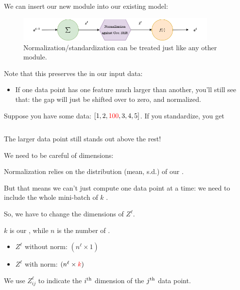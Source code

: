             We can insert our new module into our existing model:


            \begin{figure}[H]
                \centering
                    \includegraphics[width=100mm,scale=0.5]{images/nn_2_images/cov_shift_neuron.png}
                
                \caption*{Normalization/standardization can be treated just like any other module.}
            \end{figure}

            \subsecdiv

            Note that this preserves the  in our input data:
            
            \begin{itemize}
                \item If one data point has one feature much larger than another, you'll still see that: the gap will just be shifted over to zero, and normalized.
                
            \end{itemize}

            \miniex Suppose you have some data: $[1,2,\textcolor{red}{100},3,4,5]$. If you standardize, you get

            \begin{equation}
                [-0.458, -0.433, \red{2.04}, -0.408, -0.383, -0.358, ]
            \end{equation}

            The larger data point still stands out above the rest!
            
            We need to be careful of dimensions:\\

            \begin{clarification}
                Normalization relies on the distribution (mean, s.d.) of our .

                But that means we can't just compute one data point at a time: we need to include the whole mini-batch of $k$ .

                So, we have to change the dimensions of $Z^\ell$.

                $k$ is our , while $n$ is the number of . 
                

                \begin{itemize}
                    \item $Z^\ell$ without norm: $(n^\ell \times 1)$
                    \item $Z^\ell$ with norm: $(n^\ell \times \textcolor{red}{k})$
                \end{itemize}

                We use $Z_{ij}^\ell$ to indicate the $i^{ \text{th} }$ dimension of the $j^{ \text{th} }$ data point.
            \end{clarification}
            

